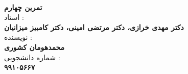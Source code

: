 \begin{center}
    \\
    \vspace*{5mm}
    \textbf{تمرین چهارم}
    \\
    \vspace*{7mm}
    استاد :
    \\
    \vspace*{2mm}
    \textbf{\Large{دکتر مهدی خرازی،‌ دکتر مرتضی امینی، دکتر کامبیز میزانیان}}
    \\
    \vspace*{7mm}
    نویسنده :
    \\
    \vspace*{2mm}
    \textbf{\Large{محمدهومان کشوری}}
    \\
    \vspace*{7mm}
    شماره دانشجویی :
    \\
    \vspace*{2mm}
    \textbf{\Large{۹۹۱۰۵۶۶۷}}
\end{center}